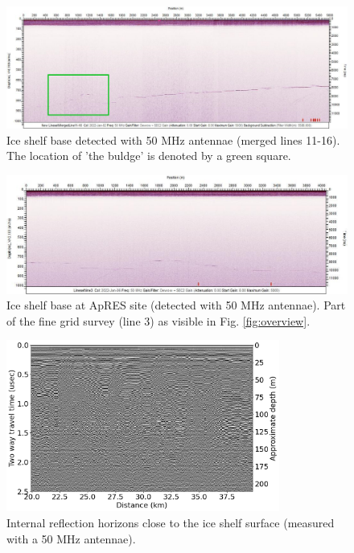 \documentclass[a4paper,12pt]{article}
\begin{document}
\begin{figure}[H]
\includegraphics[width=\textwidth]{Figures/PulseEkko/PE_bulge.png}
\caption{Ice shelf base detected with 50 MHz antennae (merged lines 11-16). The location of 'the buldge' is denoted by a green square.}
\label{fig_PE_bulge}
\end{figure}
\begin{figure}[H]
\includegraphics[width=\textwidth]{Figures/PulseEkko/Pulse_Ekko_FG1_line3.jpg}
\caption{Ice shelf base at ApRES site (detected with 50 MHz antennae). Part of the fine grid survey (line 3) as visible in Fig. \ref{fig:overview}.}
\label{fig_PE_ApRES_site}
\end{figure}
\begin{figure}[H]
\includegraphics[width=0.8\textwidth]{Figures/PulseEkko/PE_layers_surface.png}
\caption{Internal reflection horizons close to the ice shelf surface (measured with a 50 MHz antennae).}
\label{fig_IRH1}
\end{figure}
\end{document}
